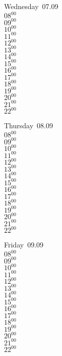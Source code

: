 \documentclass[11pt,a4paper]{book}\usepackage[]{graphicx}\usepackage[]{color}
\begin{document}
\begin{weekdaybox}
  Wednesday~07.09\\
  { 
  \vfill
  $08^{00}$\\
$09^{00}$\\
$10^{00}$\\
$11^{00}$\\
$12^{00}$\\
$13^{00}$\\
$14^{00}$\\
$15^{00}$\\
$16^{00}$\\
$17^{00}$\\
$18^{00}$\\
$19^{00}$\\
$20^{00}$\\
$21^{00}$\\
$22^{00}$\\
  }
\end{weekdaybox}
\clearpage
\begin{headerbox}
\end{headerbox}
\begin{weekdaybox}
  Thursday~08.09\\
  { 
  \vfill
  $08^{00}$\\
$09^{00}$\\
$10^{00}$\\
$11^{00}$\\
$12^{00}$\\
$13^{00}$\\
$14^{00}$\\
$15^{00}$\\
$16^{00}$\\
$17^{00}$\\
$18^{00}$\\
$19^{00}$\\
$20^{00}$\\
$21^{00}$\\
$22^{00}$\\
  }
\end{weekdaybox} 
\begin{weekdaybox}
  Friday~09.09\\
  { 
  \vfill
  $08^{00}$\\
$09^{00}$\\
$10^{00}$\\
$11^{00}$\\
$12^{00}$\\
$13^{00}$\\
$14^{00}$\\
$15^{00}$\\
$16^{00}$\\
$17^{00}$\\
$18^{00}$\\
$19^{00}$\\
$20^{00}$\\
$21^{00}$\\
$22^{00}$\\
  }
\end{weekdaybox}
\end{document}
